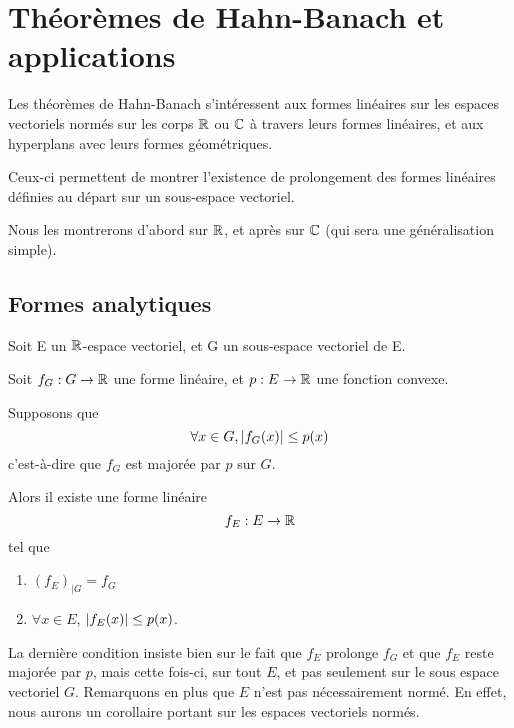 \chapter{Théorèmes de Hahn-Banach et applications}

Les théorèmes de Hahn-Banach s'intéressent aux formes linéaires sur les espaces
vectoriels normés sur les corps $\mathbb{R}$ ou $\mathbb{C}$ à travers leurs formes
linéaires, et aux hyperplans avec leurs formes géométriques.

Ceux-ci permettent de montrer l'existence de prolongement des formes linéaires
définies au départ sur un sous-espace vectoriel.

Nous les montrerons d'abord sur $\mathbb{R}$, et après sur $\mathbb{C}$ (qui sera une
généralisation simple).

\section{Formes analytiques}

\begin{theorem} 
\label{theorem_hahn_banach_analytic_1}
	Soit E un $\mathbb{R}$-espace vectoriel, et G un sous-espace vectoriel de E.

	Soit $f_{G} : G \rightarrow \mathbb{R}$ une forme linéaire, et
	$p : E \rightarrow \mathbb{R}$ une fonction convexe.

	Supposons que
	\begin{equation}
		\forall x \in G, \abs{f_{G}(x)} \leq p(x)
	\end{equation}
	c'est-à-dire que $f_{G}$ est majorée par $p$ sur $G$.

	Alors il existe une forme linéaire
	\begin{equation}
		f_{E} : E \rightarrow \mathbb{R}
	\end{equation}
	tel que
	\begin{enumerate}
		\item ${(f_{E})}_{|G} = f_{G}$
		\item $\forall x \in E$, $\abs{f_{E}(x)} \leq p(x)$.
	\end{enumerate}
\end{theorem}

La dernière condition insiste bien sur le fait que $f_{E}$ prolonge $f_{G}$ et
que $f_{E}$ reste majorée par $p$, mais cette fois-ci, sur tout $E$, et pas
seulement sur le sous espace vectoriel $G$.
Remarquons en plus que $E$ n'est pas nécessairement normé. En effet, nous aurons
un corollaire portant sur les espaces vectoriels normés.

